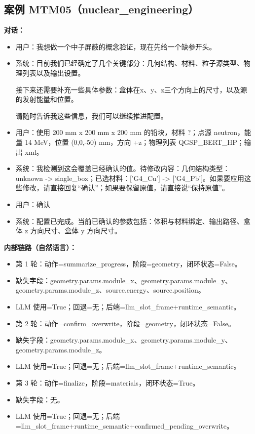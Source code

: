 \documentclass[11pt]{ctexart}
\begin{document}
\subsection{案例 MTM05（nuclear\_engineering）}
\textbf{对话：}
\begin{itemize}
\item 用户：我想做一个中子屏蔽的概念验证，现在先给一个缺参开头。
\item 系统：目前我们已经确定了几个关键部分：几何结构、材料、粒子源类型、物理列表以及输出设置。

接下来还需要补充一些具体参数：盒体在x、y、z三个方向上的尺寸，以及源的发射能量和位置。

请随时告诉我这些信息，我们可以继续推进配置。
\item 用户：使用 200 mm x 200 mm x 200 mm 的铅块，材料 ?；点源 neutron，能量 14 MeV，位置 (0,0,-50) mm，方向 +z；物理列表 QGSP\_BERT\_HP；输出 xml。
\item 系统：我检测到这会覆盖已经确认的值。待修改内容：几何结构类型：unknown -> single\_box；已选材料：['G4\_Cu'] -> ['G4\_Pb']。如果要应用这些修改，请直接回复“确认”；如果要保留原值，请直接说“保持原值”。
\item 用户：确认
\item 系统：配置已完成。当前已确认的参数包括：体积与材料绑定、输出路径、盒体 z 方向尺寸、盒体 y 方向尺寸。
\end{itemize}
\textbf{内部链路（自然语言）：}
\begin{itemize}
\item 第 1 轮：动作=summarize\_progress，阶段=geometry，闭环状态=False。
\item 缺失字段：geometry.params.module\_x、geometry.params.module\_y、geometry.params.module\_z、source.energy、source.position。
\item LLM 使用=True；回退=无；后端=llm\_slot\_frame+runtime\_semantic。
\item 第 2 轮：动作=confirm\_overwrite，阶段=geometry，闭环状态=False。
\item 缺失字段：geometry.params.module\_x、geometry.params.module\_y、geometry.params.module\_z。
\item LLM 使用=True；回退=无；后端=llm\_slot\_frame+runtime\_semantic。
\item 第 3 轮：动作=finalize，阶段=materials，闭环状态=True。
\item 缺失字段：无。
\item LLM 使用=True；回退=无；后端=llm\_slot\_frame+runtime\_semantic+confirmed\_pending\_overwrite。
\end{itemize}
\end{document}
